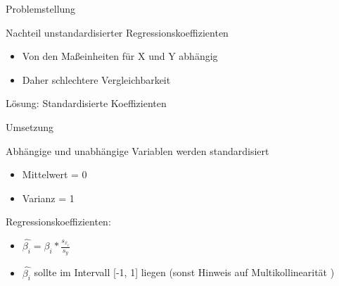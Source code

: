 \documentclass[10pt]{beamer}
\begin{document}
\begin{frame}{Problemstellung}
	
	\begin{Large}{Nachteil unstandardisierter Regressionskoeffizienten}\end{Large}
	
	  \begin{itemize}
		\item Von den Maßeinheiten für X und Y abhängig
		\item Daher schlechtere Vergleichbarkeit
	  \end{itemize}
	 
	\begin{Large}{Lösung: Standardisierte Koeffizienten}\end{Large}
	  
	
\end{frame}


\begin{frame}{Umsetzung}
	
	\begin{Large}{Abhängige und unabhängige Variablen werden standardisiert}\end{Large}
	
	\begin{itemize}
		\item Mittelwert = 0
		\item Varianz = 1
	\end{itemize}
	
	\begin{Large}{Regressionskoeffizienten:}\end{Large}
		\begin{itemize}
     	       \item $\hat{\beta_i} = \beta_i*\frac{s_{x_i}}{s_y}$
     	       \item $\hat{\beta_i}$ sollte im Intervall [-1, 1] liegen (sonst Hinweis auf Multikollinearität )
		\end{itemize}
	
\end{frame}
\end{document}
